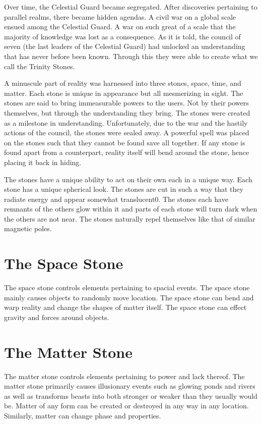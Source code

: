 Over time, the Celestial Guard became segregated. After discoveries pertaining to parallel realms, there became hidden agendas. A civil war on a global scale ensued among the Celestial Guard. A war on such great of a scale that the majority of knowledge was lost as a consequence. As it is told, the council of seven (the last leaders of the Celestial Guard) had unlocked an understanding that has never before been known. Through this they were able to create what we call the Trinity Stones. 

A minuscule part of reality was harnessed into three stones, space, time, and matter. Each stone is unique in appearance but all mesmerizing in sight. The stones are said to bring immeasurable powers to the users. Not by their powers themselves, but through the understanding they bring. The stones were created as a milestone in understanding. Unfortunately, due to the war and the hastily actions of the council, the stones were sealed away. A powerful spell was placed on the stones such that they cannot be found save all together. If any stone is found apart from a counterpart, reality itself will bend around the stone, hence placing it back in hiding. 

The stones have a unique ability to act on their own each in a unique way. Each stone has a unique spherical look. The stones are cut in such a way that they radiate energy and appear somewhat translucent0. The stones each have remnants of the others glow within it and parts of each stone will turn dark when the others are not near. The stones naturally repel themselves like that of similar magnetic poles.

\section{The Space Stone}

The space stone controls elements pertaining to spacial events. The space stone mainly causes objects to randomly move location. The space stone can bend and warp reality and change the shapes of matter itself. The space stone can effect gravity and forces around objects.

\section{The Matter Stone}

The matter stone controls elements pertaining to power and lack thereof. The matter stone primarily causes illusionary events such as glowing ponds and rivers as well as transforms beasts into both stronger or weaker than they usually would be. Matter of any form can be created or destroyed in any way in any location. Similarly, matter can change phase and properties.

